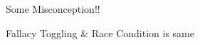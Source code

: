 \begin{frame}{Some Misconception!!}
    \begin{block}{Fallacy}
    Toggling \& Race Condition is same
\end{block}
\end{frame}